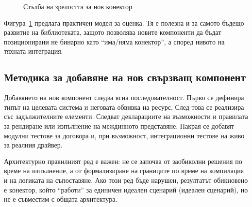 \begin{figure}[H]
\centering
{}
\caption{Стълба на зрелостта за нов конектор}
\label{fig:connector_maturity_ladder}
\end{figure}

Фигура~\ref{fig:connector_maturity_ladder} предлага практичен модел за оценка. Тя е полезна и за самото бъдещо развитие на библиотеката, защото позволява новите компоненти да бъдат позиционирани не бинарно като ``има/няма конектор'', а според нивото на тяхната интеграция.

\subsection{Методика за добавяне на нов свързващ компонент}

Добавянето на нов компонент следва ясна последователност. Първо се дефинира типът на целевата система и неговата обвивка на ресурс. След това се реализира  със задължителните елементи. Следват декларациите на възможности и правилата за рендиране или изпълнение на междинното представяне. Накрая се добавят модулни тестове за договора и, при възможност, интеграционни тестове на живо за реалния драйвер.

Архитектурно правилният ред е важен: не се започва от заобиколни решения по време на изпълнение, а от формализиране на границите по време на компилация и на логиката на съпоставяне. Ако този ред бъде нарушен, резултатът обикновено е конектор, който ``работи'' за единичен идеален сценарий (идеален сценарий), но не е съвместим с общата архитектура.

